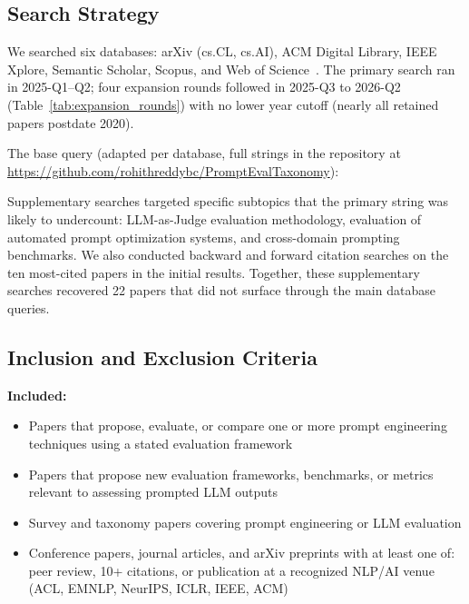 \documentclass[acmsmall, nonacm, screen]{acmart}
\begin{document}
\subsection{Search Strategy}
\label{subsec:search}

We searched six databases: arXiv (cs.CL, cs.AI), ACM Digital
Library, IEEE Xplore, Semantic Scholar, Scopus, and Web of
Science~\cite{kitchenham2007slr}. The primary search ran in
2025-Q1--Q2; four expansion rounds followed in 2025-Q3 to 2026-Q2
(Table~\ref{tab:expansion_rounds}) with no lower year cutoff
(nearly all retained papers postdate 2020).

The base query (adapted per database, full strings in the
repository at \url{https://github.com/rohithreddybc/PromptEvalTaxonomy}):


Supplementary searches targeted specific subtopics that the primary
string was likely to undercount: LLM-as-Judge evaluation methodology,
evaluation of automated prompt optimization systems, and cross-domain
prompting benchmarks.
We also conducted backward and forward citation searches on the
ten most-cited papers in the initial results. Together, these
supplementary searches recovered 22 papers that did not surface through the
main database queries.

\subsection{Inclusion and Exclusion Criteria}
\label{subsec:inclusion}

\textbf{Included:}
\begin{itemize}
\item Papers that propose, evaluate, or compare one or more
prompt engineering techniques using a stated evaluation framework
\item Papers that propose new evaluation frameworks, benchmarks,
or metrics relevant to assessing prompted LLM outputs
\item Survey and taxonomy papers covering prompt engineering or
LLM evaluation
\item Conference papers, journal articles, and arXiv preprints
with at least one of: peer review, 10+ citations, or publication
at a recognized NLP/AI venue (ACL, EMNLP, NeurIPS, ICLR, IEEE,
ACM)
\end{itemize}
\end{document}

